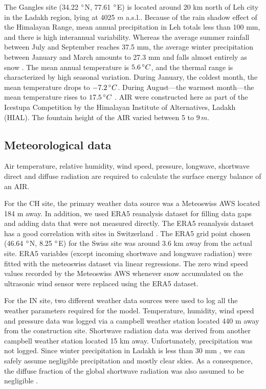 \documentclass[utf8]{frontiersSCNS} %
\begin{document}
The Gangles site (34.22 $\degree$N, 77.61 $\degree$E) is located around 20 km north of Leh city in the Ladakh
region, lying at 4025 $m$ a.s.l.. Because of the rain shadow effect of the Himalayan Range, mean annual
precipitation in Leh totals less than 100 mm, and there is high interannual variability. Whereas the average
summer rainfall between July and September reaches 37.5 mm, the average winter precipitation between January and
March amounts to 27.3 mm and falls almost entirely as snow . The mean annual temperature is $5.6 \, \degree C$,
and the thermal range is characterized by high seasonal variation. During January, the coldest month, the mean
temperature drops to $-7.2 \, \degree C$. During August—the warmest month—the mean temperature rises to $17.5 \,
	\degree C$ \citep{Nusser_2012}. AIR were constructed here as part of the Icestupa Competition  by the Himalayan
Institute of Alternatives, Ladakh (HIAL). The fountain height of the AIR varied between 5 to 9\,$m$.

\subsection{Meteorological data}

Air temperature, relative humidity, wind speed, pressure, longwave, shortwave direct and diffuse radiation are
required to calculate the surface energy balance of an AIR.

For the CH site, the primary weather data source was a Meteoswiss AWS located 184 m away. In addition, we used
ERA5 reanalysis dataset \citep{era5} for filling data gaps and adding data that were not measured directly.  The
ERA5 reanalysis dataset has a good correlation with sites in Switzerland \citep{Scherrer_2020}. The ERA5 grid
point chosen (46.64 $\degree$N, 8.25 $\degree$E) for the Swiss site was around 3.6 km away from the actual site.
ERA5 variables (except incoming shortwave and longwave radiation) were fitted with the meteoswiss dataset via
linear regressions. The zero wind speed values recorded by the Meteoswiss AWS whenever snow accumulated on the
ultrasonic wind sensor were replaced using the ERA5 dataset.

For the IN site, two different weather data sources were used to log all the weather parameters required for the
model. Temperature, humidity, wind speed and pressure data was logged via a campbell weather station located 440
m away from the construction site. Shortwave radiation data was derived from another campbell weather station
located 15 km away. Unfortunately, precipitation was not logged. Since winter precipitation in Ladakh is less
than 30 mm \citep{Nusser_2012}, we can safely assume negligible precipitation and mostly clear skies. As a
consequence, the diffuse fraction of the global shortwave radiation was also assumed to be negligible .
\end{document}
